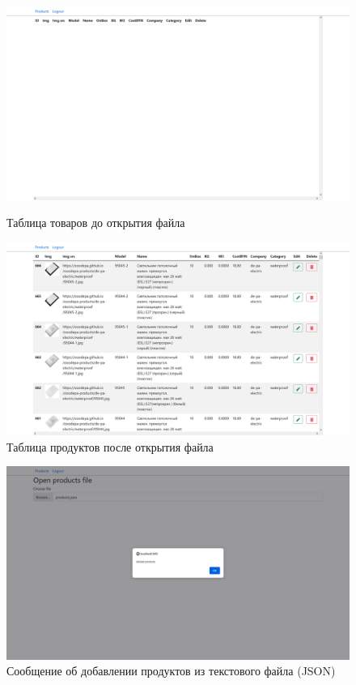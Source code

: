 \begin{figure}[!h]
    \centering
    \begin{minipage}{0.47\textwidth}
        \centering
        \includegraphics[width=\linewidth]
            {_assets/gpi_pz_empty_table.png}
        \caption{Таблица товаров до открытия файла}
        \label{fig:gpi_pz_empty_table}
    \end{minipage}
    \begin{minipage}{0.47\textwidth}
        \centering
        \includegraphics[width=\linewidth]
            {_assets/gpi_pz_not_empty_table.png}
        \caption{Таблица продуктов после открытия файла}
        \label{fig:gpi_pz_not_empty_table}
    \end{minipage}
\end{figure}

\begin{figure}[!htbp]
    \centering
    \includegraphics[width=12cm]
        {_assets/gpi_pz_open_products_json.png}
    \caption{Сообщение об добавлении продуктов из текстового файла (JSON)}
    \label{fig:gpi_pz_open_products_json}
\end{figure}

